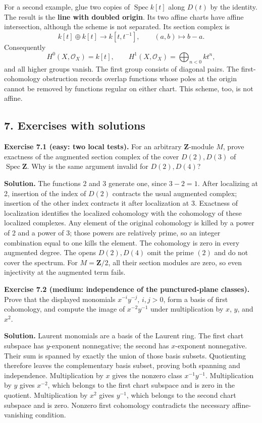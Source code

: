 \documentclass[11pt]{article}
\begin{document}
For a second example, glue two copies of \(\operatorname{Spec}k[t]\)
along \(D(t)\) by the identity. The result is the \textbf{line with
doubled origin}. Its two affine charts have affine intersection,
although the scheme is not separated. Its section complex is \[
k[t]\oplus k[t]\longrightarrow k[t,t^{-1}],\qquad
(a,b)\longmapsto b-a.
\] Consequently \[
H^0(X,\mathcal O_X)=k[t],\qquad
H^1(X,\mathcal O_X)=\bigoplus_{n<0}k t^n,
\] and all higher groups vanish. The first group consists of diagonal
pairs. The first-cohomology obstruction records overlap functions whose
poles at the origin cannot be removed by functions regular on either
chart. This scheme, too, is not affine.

\subsection{7. Exercises with solutions}\label{exercises-with-solutions}

\textbf{Exercise 7.1 (easy: two local tests).} For an arbitrary
\(\mathbf Z\)-module \(M\), prove exactness of the augmented section
complex of the cover \(D(2),D(3)\) of \(\operatorname{Spec}\mathbf Z\).
Why is the same argument invalid for \(D(2),D(4)\)?

\textbf{Solution.} The functions 2 and 3 generate one, since \(3-2=1\).
After localizing at 2, insertion of the index of \(D(2)\) contracts the
usual augmented complex; insertion of the other index contracts it after
localization at 3. Exactness of localization identifies the localized
cohomology with the cohomology of these localized complexes. Any element
of the original cohomology is killed by a power of 2 and a power of 3;
those powers are relatively prime, so an integer combination equal to
one kills the element. The cohomology is zero in every augmented degree.
The opens \(D(2),D(4)\) omit the prime \((2)\) and do not cover the
spectrum. For \(M=\mathbf Z/2\), all their section modules are zero, so
even injectivity at the augmented term fails.

\textbf{Exercise 7.2 (medium: independence of the punctured-plane
classes).} Prove that the displayed monomials \(x^{-i}y^{-j}\),
\(i,j>0\), form a basis of first cohomology, and compute the image of
\(x^{-2}y^{-1}\) under multiplication by \(x\), \(y\), and \(x^2\).

\textbf{Solution.} Laurent monomials are a basis of the Laurent ring.
The first chart subspace has \(y\)-exponent nonnegative; the second has
\(x\)-exponent nonnegative. Their sum is spanned by exactly the union of
those basis subsets. Quotienting therefore leaves the complementary
basis subset, proving both spanning and independence. Multiplication by
\(x\) gives the nonzero class \(x^{-1}y^{-1}\). Multiplication by \(y\)
gives \(x^{-2}\), which belongs to the first chart subspace and is zero
in the quotient. Multiplication by \(x^2\) gives \(y^{-1}\), which
belongs to the second chart subspace and is zero. Nonzero first
cohomology contradicts the necessary affine-vanishing condition.
\end{document}
